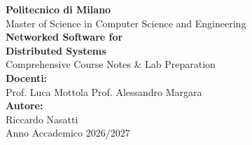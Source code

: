 \documentclass[11pt,a4paper,oneside]{book}
\begin{document}
\begin{titlepage}
    \centering
    \vspace*{2cm}
    {\Large \textbf{Politecnico di Milano}}\\[0.5cm]
    {\large Master of Science in Computer Science and Engineering}\\[2.5cm]

    {\Huge \textbf{Networked Software for\\Distributed Systems}}\\[1cm]
    {\LARGE Comprehensive Course Notes \& Lab Preparation}\\[2.5cm]

    {\large \textbf{Docenti:}}\\
    {\large Prof. Luca Mottola \quad Prof. Alessandro Margara}\\[2cm]

    \vfill
    {\large \textbf{Autore:}}\\
    {\large Riccardo Nasatti}\\[1.5cm]

    {\large Anno Accademico 2026/2027}
    \vspace*{1.5cm}
\end{titlepage}

\tableofcontents
\clearpage


\end{document}
